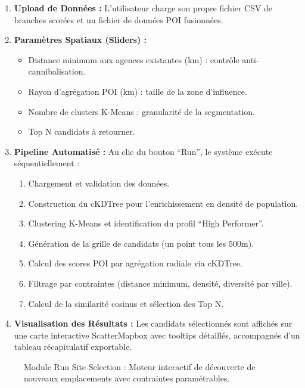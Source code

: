 \begin{enumerate}
    \item \textbf{Upload de Données :} L'utilisateur charge son propre fichier CSV de branches scorées et un fichier de données POI fusionnées.
    \item \textbf{Paramètres Spatiaux (Sliders) :}
    \begin{itemize}
        \item Distance minimum aux agences existantes (km) : contrôle anti-cannibalisation.
        \item Rayon d'agrégation POI (km) : taille de la zone d'influence.
        \item Nombre de clusters K-Means : granularité de la segmentation.
        \item Top N candidats à retourner.
    \end{itemize}
    \item \textbf{Pipeline Automatisé :} Au clic du bouton ``Run'', le système exécute séquentiellement :
    \begin{enumerate}
        \item Chargement et validation des données.
        \item Construction du cKDTree pour l'enrichissement en densité de population.
        \item Clustering K-Means et identification du profil ``High Performer''.
        \item Génération de la grille de candidats (un point tous les 500m).
        \item Calcul des scores POI par agrégation radiale via cKDTree.
        \item Filtrage par contraintes (distance minimum, densité, diversité par ville).
        \item Calcul de la similarité cosinus et sélection des Top N.
    \end{enumerate}
    \item \textbf{Visualisation des Résultats :} Les candidats sélectionnés sont affichés sur une carte interactive ScatterMapbox avec tooltips détaillés, accompagnés d'un tableau récapitulatif exportable.
\end{enumerate}

\begin{figure}[h]
    \centering
    \caption{Module Run Site Selection : Moteur interactif de découverte de nouveaux emplacements avec contraintes paramétrables.}
    \label{fig:screenshot_runsite}
\end{figure}

